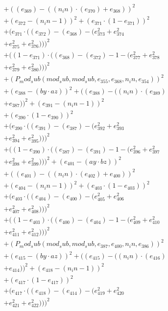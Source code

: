 \documentclass[10pt, a4paper]{article}
\begin{document}
\begin{align*}
& + ((e_{369}) - ((n_in)  \cdot  (e_{370}) + e_{368}))^{2} \\
& + (e_{372} - (n_in - 1))^{2} + (e_{371}  \cdot  (1 - e_{371}))^{2} \\
& + (e_{371}  \cdot  ((e_{372}) - (e_{368}) - (e_{373}^{2} + e_{374}^{2} \\
& + e_{375}^{2} + e_{376}^{2})))^{2} \\
& + ((1 - e_{371})  \cdot  ((e_{368}) - (e_{372}) - 1 - (e_{377}^{2} + e_{378}^{2} \\
& + e_{379}^{2} + e_{380}^{2})))^{2} \\
& + (P_mod_sub(mod_sub, mod_sub, e_{355}, e_{368}, n_in, e_{354}))^{2} \\
& + (e_{388} - (by  \cdot  az))^{2} + ((e_{388}) - ((n_in)  \cdot  (e_{389}) \\
& + e_{387}))^{2} + (e_{391} - (n_in - 1))^{2} \\
& + (e_{390}  \cdot  (1 - e_{390}))^{2} \\
& + (e_{390}  \cdot  ((e_{391}) - (e_{387}) - (e_{392}^{2} + e_{393}^{2} \\
& + e_{394}^{2} + e_{395}^{2})))^{2} \\
& + ((1 - e_{390})  \cdot  ((e_{387}) - (e_{391}) - 1 - (e_{396}^{2} + e_{397}^{2} \\
& + e_{398}^{2} + e_{399}^{2})))^{2} + (e_{401} - (ay  \cdot  bz))^{2} \\
& + ((e_{401}) - ((n_in)  \cdot  (e_{402}) + e_{400}))^{2} \\
& + (e_{404} - (n_in - 1))^{2} + (e_{403}  \cdot  (1 - e_{403}))^{2} \\
& + (e_{403}  \cdot  ((e_{404}) - (e_{400}) - (e_{405}^{2} + e_{406}^{2} \\
& + e_{407}^{2} + e_{408}^{2})))^{2} \\
& + ((1 - e_{403})  \cdot  ((e_{400}) - (e_{404}) - 1 - (e_{409}^{2} + e_{410}^{2} \\
& + e_{411}^{2} + e_{412}^{2})))^{2} \\
& + (P_mod_sub(mod_sub, mod_sub, e_{387}, e_{400}, n_in, e_{386}))^{2} \\
& + (e_{415} - (by  \cdot  az))^{2} + ((e_{415}) - ((n_in)  \cdot  (e_{416}) \\
& + e_{414}))^{2} + (e_{418} - (n_in - 1))^{2} \\
& + (e_{417}  \cdot  (1 - e_{417}))^{2} \\
& + (e_{417}  \cdot  ((e_{418}) - (e_{414}) - (e_{419}^{2} + e_{420}^{2} \\
& + e_{421}^{2} + e_{422}^{2})))^{2} \\

\end{align*}
\end{document}
